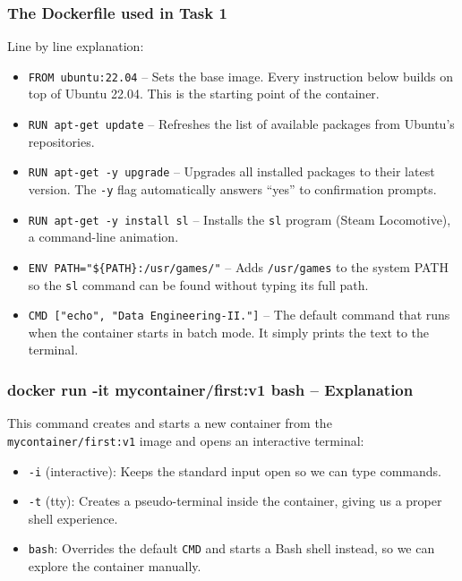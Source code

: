 \documentclass[11pt,a4paper]{article}
\begin{document}
\subsubsection{The Dockerfile used in Task 1}



Line by line explanation:

\begin{itemize}[leftmargin=1.5cm]
  \item \texttt{FROM ubuntu:22.04} -- Sets the base image. Every instruction
        below builds on top of Ubuntu 22.04. This is the starting point of
        the container.
  \item \texttt{RUN apt-get update} -- Refreshes the list of available
        packages from Ubuntu's repositories.
  \item \texttt{RUN apt-get -y upgrade} -- Upgrades all installed packages
        to their latest version. The \texttt{-y} flag automatically answers
        ``yes'' to confirmation prompts.
  \item \texttt{RUN apt-get -y install sl} -- Installs the \texttt{sl}
        program (Steam Locomotive), a command-line animation.
  \item \texttt{ENV PATH="\$\{PATH\}:/usr/games/"} -- Adds \texttt{/usr/games}
        to the system PATH so the \texttt{sl} command can be found without
        typing its full path.
  \item \texttt{CMD ["echo", "Data Engineering-II."]} -- The default command
        that runs when the container starts in batch mode. It simply prints
        the text to the terminal.
\end{itemize}

\subsubsection{docker run -it mycontainer/first:v1 bash -- Explanation}

This command creates and starts a new container from the
\texttt{mycontainer/first:v1} image and opens an interactive terminal:

\begin{itemize}[leftmargin=1.5cm]
  \item \texttt{-i} (interactive): Keeps the standard input open so we
        can type commands.
  \item \texttt{-t} (tty): Creates a pseudo-terminal inside the container,
        giving us a proper shell experience.
  \item \texttt{bash}: Overrides the default \texttt{CMD} and starts a
        Bash shell instead, so we can explore the container manually.
\end{itemize}
\end{document}
